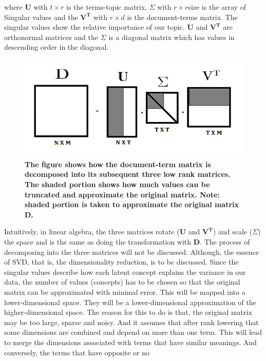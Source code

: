 \documentclass[12pt]{report}
\begin{document}
        where \textbf{U} with ${t \times r}$ is the terms-topic matrix, ${\Sigma}$ with ${r \times r}$size is the array of Singular values and 
        the ${\mathbf{V^T}}$ with ${r \times d}$ is the document-terms matrix. 
        The singular values show the relative importance of our topic. \textbf{U} and ${\mathbf{V^T}}$ are orthonormal matrices and the ${\Sigma}$ is a diagonal matrix which has values 
        in descending order in the diagonal.
        \begin{figure}
            \centering
            \includegraphics[scale=0.7]{lsa.png}
            \caption{\textbf{The figure shows how the document-term matrix is decomposed into its subsequent three low rank matrices. The shaded portion shows how much 
            values can be truncated and approximate the original matrix. Note: shaded portion is taken to approximate the original matrix \textbf{D}.}}
        \end{figure}
        Intuitively, in linear algebra, the three matrices rotate (\textbf{U} and ${\mathbf{V^T}}$) and scale (${\Sigma}$) the space and is the same as doing 
        the transformation with \textbf{D}. 
        The process of decomposing into the three matrices will not be discussed. Although, the essence of SVD, that is, the dimensionality reduction, is to be discussed. 
        Since the singular values describe how each latent concept explains the variance in our data, the number of values (concepts) has to be chosen so that the original
        matrix can be approximated with minimal error. This will be mapped into a lower-dimensional space. They will be a lower-dimensional approximation of the higher-dimensional space. 
        The reason for this to do is that, the original matrix may be too large, sparse and noisy. And it assumes that after rank lowering that some dimensions are combined and
        depend on more than one term. This will lead to merge the dimensions associated with terms that have similar meanings. And conversely, the terms that have opposite or no 
\end{document}
